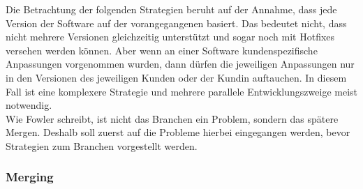 Die Betrachtung der folgenden Strategien beruht auf der Annahme, dass jede Version der Software auf der vorangegangenen basiert. Das bedeutet nicht, dass nicht mehrere Versionen gleichzeitig unterstützt und sogar noch mit Hotfixes versehen werden können. Aber wenn an einer Software kundenspezifische Anpassungen vorgenommen wurden, dann dürfen die jeweiligen Anpassungen nur in den Versionen des jeweiligen Kunden oder der Kundin auftauchen. In diesem Fall ist eine komplexere Strategie und mehrere parallele Entwicklungszweige meist notwendig.
\\
Wie Fowler \cite{Fowler:2020:Patterns:07} schreibt, ist nicht das Branchen ein Problem, sondern das spätere Mergen. Deshalb soll zuerst auf die Probleme hierbei eingegangen werden, bevor Strategien zum Branchen vorgestellt werden.

%

\subsubsection{Merging}

